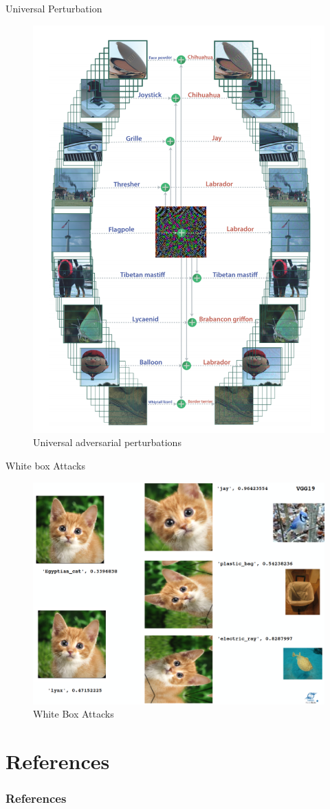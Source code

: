 \documentclass[xcolor=pdftex,dvipsnames,table,mathserif]{beamer}
\begin{document}
\begin{frame}{Universal Perturbation}
\begin{figure}
\includegraphics[width=.45\columnwidth]{../graphics/UniversalPerturbation}
\caption{Universal adversarial perturbations \cite{moosavi2017universal}}
\end{figure}
\end{frame}

\begin{frame}{White box Attacks}
\begin{figure}
\includegraphics[width=.95\columnwidth]{../graphics/WhiteBoxAttack}
\caption{White Box Attacks \cite{akhtar2018threat}}
\end{figure}
\end{frame}





\section{References}
\begin{frame}[allowframebreaks]
	\frametitle{References}
	
\end{frame}
\end{document}
